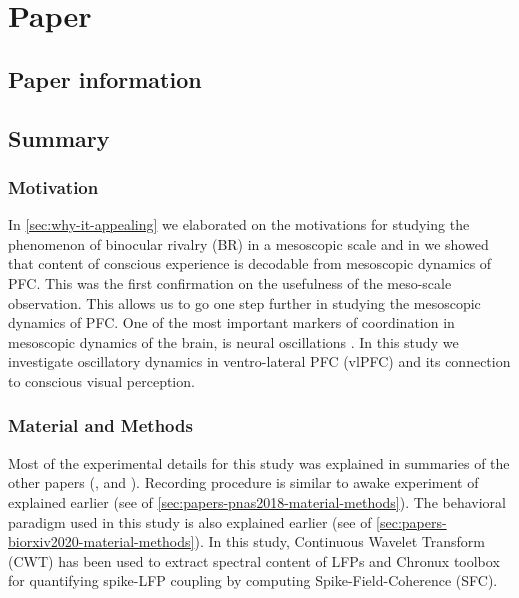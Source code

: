 \chapter{Paper }\label{cha:paper-dwarakanath2020}
\section*{Paper information} %



\section*{Summary} %
\subsection*{Motivation}
In \autoref{sec:why-it-appealing} we elaborated on the motivations for studying the phenomenon of binocular rivalry (BR) in a mesoscopic scale
and in  we showed that content of conscious experience is decodable from mesoscopic dynamics of PFC. %
This was the first confirmation on the usefulness of the meso-scale observation.
This allows us to go one step further in studying the mesoscopic dynamics of PFC.
One of the most important markers of coordination in mesoscopic dynamics of the brain,
is neural oscillations \cite{buzsakiRhythmsBrain2011,buzsakiScalingBrainSize2013a}.
In this study we investigate oscillatory dynamics in ventro-lateral PFC (vlPFC) and its connection to conscious visual perception.

\subsection*{Material and Methods}
Most of the experimental details for this study was explained in summaries of the other papers
(, and ).
Recording procedure is similar to awake experiment of
 explained earlier (see \matmet of \autoref{sec:papers-pnas2018-material-methods}).
The behavioral paradigm used in this study is also explained earlier
(see \matmet of \autoref{sec:papers-biorxiv2020-material-methods}).
In this study, Continuous Wavelet Transform (CWT) \cite{mallatWaveletTourSignal1999} has been used to extract spectral content of LFPs
and Chronux toolbox \cite{bokilChronuxPlatformAnalyzing2010} for quantifying spike-LFP coupling by computing Spike-Field-Coherence (SFC).


